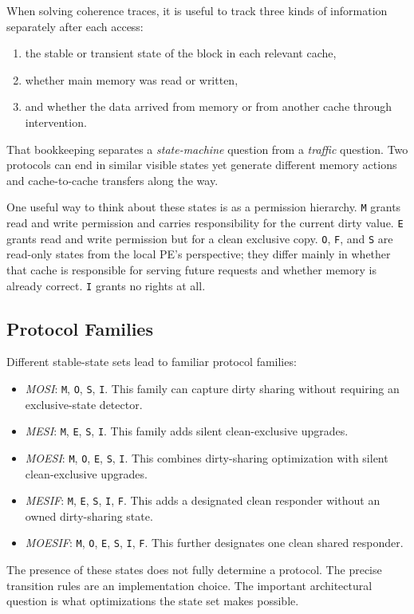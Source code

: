 When solving coherence traces, it is useful to track three kinds of information separately after each access:
\begin{enumerate}
    \item the stable or transient state of the block in each relevant cache,
    \item whether main memory was read or written,
    \item and whether the data arrived from memory or from another cache through intervention.
\end{enumerate}
That bookkeeping separates a \emph{state-machine} question from a \emph{traffic} question.
Two protocols can end in similar visible states yet generate different memory actions and cache-to-cache transfers along the way.

One useful way to think about these states is as a permission hierarchy.
\texttt{M} grants read and write permission and carries responsibility for the current dirty value.
\texttt{E} grants read and write permission but for a clean exclusive copy.
\texttt{O}, \texttt{F}, and \texttt{S} are read-only states from the local PE's perspective; they differ mainly in whether that cache is responsible for serving future requests and whether memory is already correct.
\texttt{I} grants no rights at all.

\subsection*{Protocol Families}
Different stable-state sets lead to familiar protocol families:
\begin{itemize}
    \item \textit{MOSI}: \texttt{M}, \texttt{O}, \texttt{S}, \texttt{I}.
    This family can capture dirty sharing without requiring an exclusive-state detector.
    \item \textit{MESI}: \texttt{M}, \texttt{E}, \texttt{S}, \texttt{I}.
    This family adds silent clean-exclusive upgrades.
    \item \textit{MOESI}: \texttt{M}, \texttt{O}, \texttt{E}, \texttt{S}, \texttt{I}.
    This combines dirty-sharing optimization with silent clean-exclusive upgrades.
    \item \textit{MESIF}: \texttt{M}, \texttt{E}, \texttt{S}, \texttt{I}, \texttt{F}.
    This adds a designated clean responder without an owned dirty-sharing state.
    \item \textit{MOESIF}: \texttt{M}, \texttt{O}, \texttt{E}, \texttt{S}, \texttt{I}, \texttt{F}.
    This further designates one clean shared responder.
\end{itemize}
The presence of these states does not fully determine a protocol.
The precise transition rules are an implementation choice.
The important architectural question is what optimizations the state set makes possible.

